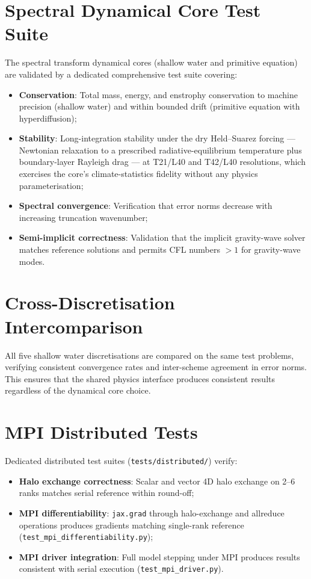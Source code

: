 \documentclass[11pt,twoside]{report}
\begin{document}
\section{Spectral Dynamical Core Test Suite}
\label{sec:spectral-tests}

The spectral transform dynamical cores (shallow water and primitive
equation) are validated by a dedicated comprehensive test suite covering:
\begin{itemize}[nosep]
  \item \textbf{Conservation}: Total mass, energy, and enstrophy
    conservation to machine precision (shallow water) and within
    bounded drift (primitive equation with hyperdiffusion);
  \item \textbf{Stability}: Long-integration stability under the dry
    Held--Suarez forcing \citep{HeldSuarez1994} --- Newtonian relaxation to a
    prescribed radiative-equilibrium temperature plus boundary-layer Rayleigh
    drag --- at T21/L40 and T42/L40 resolutions, which exercises the core's
    climate-statistics fidelity without any physics parameterisation;
  \item \textbf{Spectral convergence}: Verification that error norms
    decrease with increasing truncation wavenumber;
  \item \textbf{Semi-implicit correctness}: Validation that the implicit
    gravity-wave solver matches reference solutions and permits
    CFL numbers $>1$ for gravity-wave modes.
\end{itemize}

\section{Cross-Discretisation Intercomparison}

All five shallow water discretisations are compared on the same test
problems, verifying consistent convergence rates and inter-scheme
agreement in error norms.  This ensures that the shared physics interface
produces consistent results regardless of the dynamical core choice.

\section{MPI Distributed Tests}

Dedicated distributed test suites (\texttt{tests/distributed/}) verify:
\begin{itemize}[nosep]
  \item \textbf{Halo exchange correctness}: Scalar and vector 4D halo
    exchange on 2--6 ranks matches serial reference within round-off;
  \item \textbf{MPI differentiability}: \texttt{jax.grad} through
    halo-exchange and allreduce operations produces gradients matching
    single-rank reference (\texttt{test\_mpi\_differentiability.py});
  \item \textbf{MPI driver integration}: Full model stepping under MPI
    produces results consistent with serial execution
    (\texttt{test\_mpi\_driver.py}).
\end{itemize}
\end{document}
